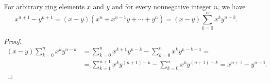 \begin{proposition}\label{thm:xn_minus_yn_factorization}
  For arbitrary \hyperref[def:ring]{ring} elements \( x \) and \( y \) and for every nonnegative integer \( n \), we have
  \begin{equation}\label{eq:thm:xn_minus_yn_factorization}
    x^{n + 1} - y^{n + 1} = (x - y)(x^n + x^{n-1} y + \cdots + y^n) = (x - y) \sum_{k=0}^n x^k y^{n-k}.
  \end{equation}
\end{proposition}
\begin{proof}
  \begin{align*}
    (x - y) \sum_{k=0}^n x^k y^{n-k}
    &=
    \sum_{k=0}^n x^{k+1} y^{n-k} - \sum_{k=0}^n x^k y^{n-k+1}
    = \\ &=
    \sum_{k=1}^{n+1} x^k y^{(n+1)-k} - \sum_{k=0}^n x^k y^{(n+1)-k}
    =
    x^{n+1} - y^{n+1}.
  \end{align*}
\end{proof}

